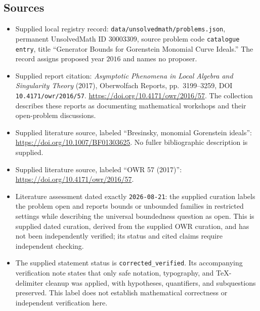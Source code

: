 \documentclass[11pt]{article}
\begin{document}
\subsection{Sources}
\begin{itemize}
\item Supplied local registry record: \texttt{data/unsolvedmath/problems.json}, permanent UnsolvedMath ID \(30003309\), source problem code \texttt{catalogue entry}, title ``Generator Bounds for Gorenstein Monomial Curve Ideals.'' The record assigns proposed year \(2016\) and names no proposer.
\item Supplied report citation: \emph{Asymptotic Phenomena in Local Algebra and Singularity Theory} (2017), Oberwolfach Reports, pp.~3199--3259, DOI \texttt{10.4171/owr/2016/57}. \url{https://doi.org/10.4171/owr/2016/57}. The collection describes these reports as documenting mathematical workshops and their open-problem discussions.
\item Supplied literature source, labeled ``Bresinsky, monomial Gorenstein ideals'': \url{https://doi.org/10.1007/BF01303625}. No fuller bibliographic description is supplied.
\item Supplied literature source, labeled ``OWR 57 (2017)'': \url{https://doi.org/10.4171/owr/2016/57}.
\item Literature assessment dated exactly \texttt{2026-08-21}: the supplied curation labels the problem open and reports bounds or unbounded families in restricted settings while describing the universal boundedness question as open. This is supplied dated curation, derived from the supplied OWR curation, and has not been independently verified; its status and cited claims require independent checking.
\item The supplied statement status is \texttt{corrected\_verified}. Its accompanying verification note states that only safe notation, typography, and TeX-delimiter cleanup was applied, with hypotheses, quantifiers, and subquestions preserved. This label does not establish mathematical correctness or independent verification here.
\end{itemize}
\end{document}
